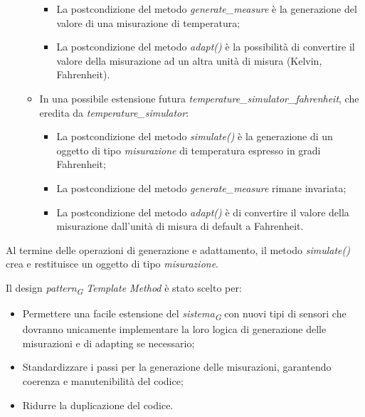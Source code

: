 \begin{itemize}
\begin{itemize}
\begin{itemize}
            \item La postcondizione del metodo \textit{generate\_measure} è la generazione del valore di una misurazione di temperatura;
            
            \item La postcondizione del metodo \textit{adapt()} è la possibilità di convertire il valore della misurazione ad un altra unità di misura (Kelvin, Fahrenheit).
        \end{itemize}

        \item In una possibile estensione futura \textit{temperature\_simulator\_fahrenheit}, che eredita da \textit{temperature\_simulator}:
        \begin{itemize}
            \item La postcondizione del metodo \textit{simulate()} è la generazione di un oggetto di tipo \textit{misurazione} di temperatura espresso in gradi Fahrenheit;
            
            \item La postcondizione del metodo \textit{generate\_measure} rimane invariata;
            
            \item La postcondizione del metodo \textit{adapt()} è di convertire il valore della misurazione dall'unità di misura di default a Fahrenheit.
        \end{itemize}
    \end{itemize}
\end{itemize}

Al termine delle operazioni di generazione e adattamento, il metodo \textit{simulate()} crea e restituisce un oggetto di tipo \textit{misurazione}.

Il design \textit{pattern}\textsubscript{\textit{G}} \textit{Template Method} è stato scelto per:
\begin{itemize}
    \item Permettere una facile estensione del \textit{sistema}\textsubscript{\textit{G}} con nuovi tipi di sensori che dovranno unicamente implementare la loro logica di generazione delle misurazioni e di adapting se necessario;
    
    \item Standardizzare i passi per la generazione delle misurazioni, garantendo coerenza e manutenibilità del codice;
    
    \item Ridurre la duplicazione del codice.
\end{itemize}

